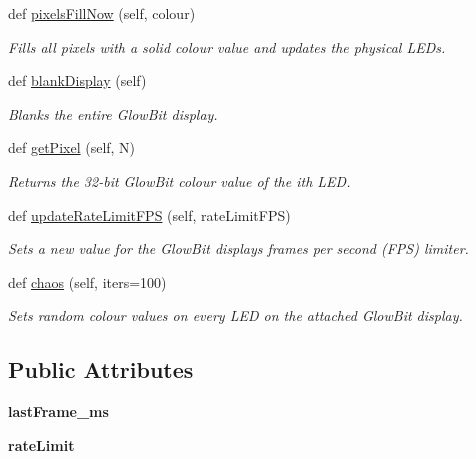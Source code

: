 \begin{DoxyCompactItemize}
def \hyperlink{classglowbit_1_1glowbit_a2aae728fcc6e8cdfe5c745ac0a7d308d}{pixels\+Fill\+Now} (self, colour)
\begin{DoxyCompactList}\small\item\em Fills all pixels with a solid colour value and updates the physical L\+E\+Ds. \end{DoxyCompactList}\item 
def \hyperlink{classglowbit_1_1glowbit_ad3ace3e4d58bc9dadf62c1306aff2464}{blank\+Display} (self)
\begin{DoxyCompactList}\small\item\em Blanks the entire Glow\+Bit display. \end{DoxyCompactList}\item 
def \hyperlink{classglowbit_1_1glowbit_a0f15a8907f807ed1af905854fedbbc60}{get\+Pixel} (self, N)
\begin{DoxyCompactList}\small\item\em Returns the 32-\/bit Glow\+Bit colour value of the i\textquotesingle{}th L\+ED. \end{DoxyCompactList}\item 
def \hyperlink{classglowbit_1_1glowbit_a7f72cb0878a688aa6181d4632428da09}{update\+Rate\+Limit\+F\+PS} (self, rate\+Limit\+F\+PS)
\begin{DoxyCompactList}\small\item\em Sets a new value for the Glow\+Bit display\textquotesingle{}s frames per second (F\+PS) limiter. \end{DoxyCompactList}\item 
def \hyperlink{classglowbit_1_1glowbit_ae95bb7e0ee556e02d918f376cffcb9ce}{chaos} (self, iters=100)
\begin{DoxyCompactList}\small\item\em Sets random colour values on every L\+ED on the attached Glow\+Bit display. \end{DoxyCompactList}\end{DoxyCompactItemize}
\subsection*{Public Attributes}
\begin{DoxyCompactItemize}
\item 
\mbox{\label{classglowbit_1_1glowbit_a5f14ddb9b3ec9a848c050b28d27ced9e}} 
{\bfseries last\+Frame\+\_\+ms}
\item 
\mbox{\label{classglowbit_1_1glowbit_a69bf20e5a054c0cf8656986b07048851}} 
{\bfseries rate\+Limit}
\end{DoxyCompactItemize}
